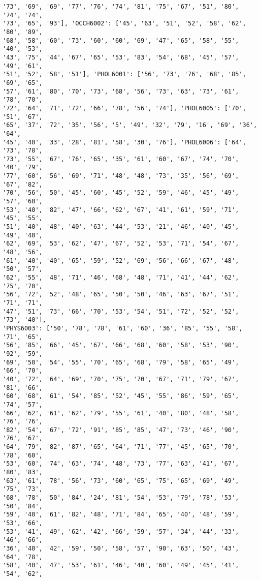 \documentclass[11pt]{article}
\begin{document}
\begin{Verbatim}[commandchars=\\\{\}]
'73', '69', '69', '77', '76', '74', '81', '75', '67', '51', '80', '74', '74',
'73', '65', '93'], 'OCCH6002': ['45', '63', '51', '52', '58', '62', '80', '89',
'68', '58', '60', '73', '60', '60', '69', '47', '65', '58', '55', '40', '53',
'43', '75', '44', '67', '65', '53', '83', '54', '68', '45', '57', '49', '61',
'51', '52', '58', '51'], 'PHOL6001': ['56', '73', '76', '68', '85', '69', '65',
'57', '61', '80', '70', '73', '68', '56', '73', '63', '73', '61', '78', '70',
'72', '64', '71', '72', '66', '78', '56', '74'], 'PHOL6005': ['70', '51', '67',
'65', '37', '72', '35', '56', '5', '49', '32', '79', '16', '69', '36', '64',
'45', '40', '33', '28', '81', '58', '30', '76'], 'PHOL6006': ['64', '73', '78',
'73', '55', '67', '76', '65', '35', '61', '60', '67', '74', '70', '40', '79',
'77', '60', '56', '69', '71', '48', '48', '73', '35', '56', '69', '67', '82',
'70', '56', '50', '45', '60', '45', '52', '59', '46', '45', '49', '57', '60',
'53', '40', '82', '47', '66', '62', '67', '41', '61', '59', '71', '45', '55',
'51', '40', '48', '40', '63', '44', '53', '21', '46', '40', '45', '49', '40',
'62', '69', '53', '62', '47', '67', '52', '53', '71', '54', '67', '48', '56',
'61', '40', '40', '65', '59', '52', '69', '56', '66', '67', '48', '50', '57',
'62', '55', '48', '71', '46', '68', '48', '71', '41', '44', '62', '75', '70',
'56', '72', '52', '48', '65', '50', '50', '46', '63', '67', '51', '71', '71',
'47', '51', '73', '66', '70', '53', '54', '51', '72', '52', '52', '73', '40'],
'PHYS6003': ['50', '78', '78', '61', '60', '36', '85', '55', '58', '71', '65',
'56', '85', '66', '45', '67', '66', '68', '60', '58', '53', '90', '92', '59',
'69', '50', '54', '55', '70', '65', '68', '79', '58', '65', '49', '66', '70',
'40', '72', '64', '69', '70', '75', '70', '67', '71', '79', '67', '81', '66',
'60', '68', '61', '54', '85', '52', '45', '55', '86', '59', '65', '74', '57',
'66', '62', '61', '62', '79', '55', '61', '40', '80', '48', '58', '76', '76',
'82', '54', '67', '72', '91', '85', '85', '47', '73', '46', '90', '76', '67',
'64', '79', '82', '87', '65', '64', '71', '77', '45', '65', '70', '78', '60',
'53', '60', '74', '63', '74', '48', '73', '77', '63', '41', '67', '80', '83',
'63', '61', '78', '56', '73', '60', '65', '75', '65', '69', '49', '75', '73',
'68', '78', '50', '84', '24', '81', '54', '53', '79', '78', '53', '50', '84',
'59', '40', '61', '82', '48', '71', '84', '65', '40', '48', '59', '53', '66',
'53', '41', '49', '62', '42', '66', '59', '57', '34', '44', '33', '46', '66',
'36', '40', '42', '59', '50', '58', '57', '90', '63', '50', '43', '64', '78',
'58', '40', '47', '53', '61', '46', '40', '60', '49', '45', '41', '54', '62',

\end{Verbatim}
\end{document}
